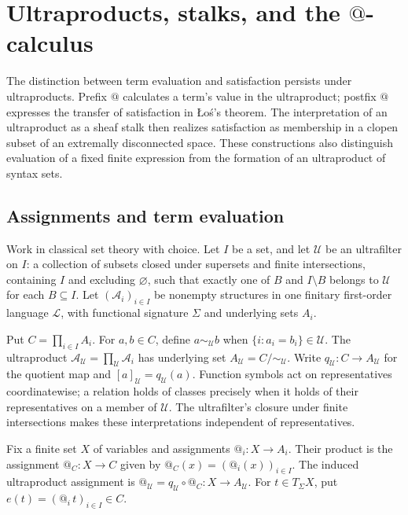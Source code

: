 \documentclass[11pt]{article}
\makeatletter
\newcommand{\atsign}{\mathord{@}}
\makeatother
\begin{document}
\section{Ultraproducts, stalks, and the
\texorpdfstring{\(\atsign\)}{@}-calculus}
\label{ultraproducts-at-calculus}

The distinction between term evaluation and satisfaction persists under
ultraproducts. Prefix \(\atsign\) calculates a term's value in the ultraproduct;
postfix \(\atsign\) expresses the transfer of satisfaction in
\L{}o\'s's theorem. The interpretation of an ultraproduct as a sheaf stalk
then realizes satisfaction as membership in a clopen subset of an
extremally disconnected space. These constructions also distinguish
evaluation of a fixed finite expression from the formation of an
ultraproduct of syntax sets.

\subsection{Assignments and term evaluation}

Work in classical set theory with choice. Let \(I\) be a set, and let
\(\mathcal U\) be an ultrafilter on \(I\): a collection of subsets closed
under supersets and finite intersections, containing \(I\) and excluding
\(\varnothing\), such that exactly one of \(B\) and \(I\setminus B\) belongs
to \(\mathcal U\) for each \(B\subseteq I\).
Let \((\mathcal A_i)_{i\in I}\) be nonempty structures in one finitary
first-order language \(\mathcal L\), with functional signature \(\Sigma\)
and underlying sets \(A_i\).

Put \(C=\prod_{i\in I}A_i\). For \(a,b\in C\), define
\(a\sim_{\mathcal U}b\) when
\(\{i:a_i=b_i\}\in\mathcal U\). The ultraproduct
\(\mathcal A_{\mathcal U}=\prod_{\mathcal U}\mathcal A_i\) has underlying
set \(A_{\mathcal U}=C/{\sim_{\mathcal U}}\). Write
\(q_{\mathcal U}:C\to A_{\mathcal U}\) for the quotient map and
\([a]_{\mathcal U}=q_{\mathcal U}(a)\). Function symbols act on
representatives coordinatewise; a relation holds of classes precisely when
it holds of their representatives on a member of \(\mathcal U\).
The ultrafilter's closure under finite intersections makes these
interpretations independent of representatives.

Fix a finite set \(X\) of variables and assignments
\(\atsign_i:X\to A_i\). Their product is the assignment
\(\atsign_C:X\to C\) given by
\(\atsign_C(x)=(\atsign_i(x))_{i\in I}\). The induced ultraproduct
assignment is
\(\atsign_{\mathcal U}=q_{\mathcal U}\circ\atsign_C:X\to A_{\mathcal U}\).
For \(t\in T_\Sigma X\), put
\(e(t)=(\atsign_i\,t)_{i\in I}\in C\).
\end{document}
